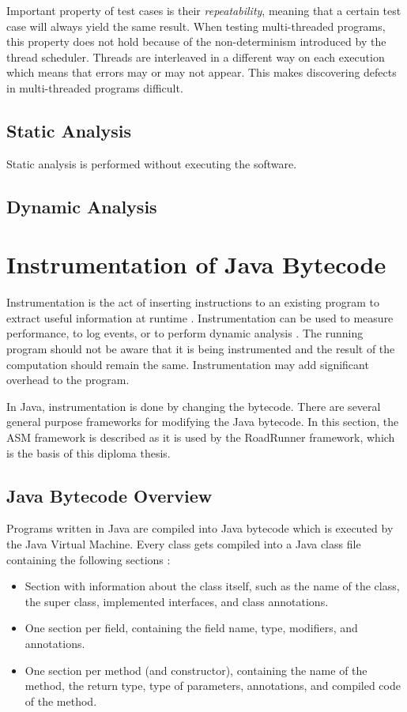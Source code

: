 Important property of test cases is their \emph{repeatability}, meaning that a
certain test case will always yield the same result. When testing multi-threaded
programs, this property does not hold because of the non-determinism introduced
by the thread scheduler. Threads are interleaved in a different way on each
execution which means that errors may or may not appear. This makes discovering
defects in multi-threaded programs difficult.

\subsection{Static Analysis}

Static analysis is performed without executing the software.

\todo{}

\subsection{Dynamic Analysis}

\todo{}


\section{Instrumentation of Java Bytecode}

Instrumentation is the act of inserting instructions to an existing program to
extract useful information at runtime . Instrumentation
can be used to measure performance, to log events, or to perform dynamic
analysis . The running program should not be aware that it
is being instrumented and the result of the computation should remain the same.
Instrumentation may add significant overhead to the program.

In Java, instrumentation is done by changing the bytecode. There are several
general purpose frameworks for modifying the Java bytecode. In this section, the
ASM framework is described as it is used by the RoadRunner framework, which is
the basis of this diploma thesis.

\subsection{Java Bytecode Overview}

Programs written in Java are compiled into Java bytecode which is executed by
the Java Virtual Machine. Every class gets compiled into a Java class file
containing the following sections \cite{asmguide}:
\begin{itemize}
    \item Section with information about the class itself, such as the name of
    the class, the super class, implemented interfaces, and class annotations.
    \item One section per field, containing the field name, type, modifiers, and
    annotations.
    \item One section per method (and constructor), containing the name of the
    method, the return type, type of parameters, annotations, and compiled code
    of the method.
\end{itemize}

